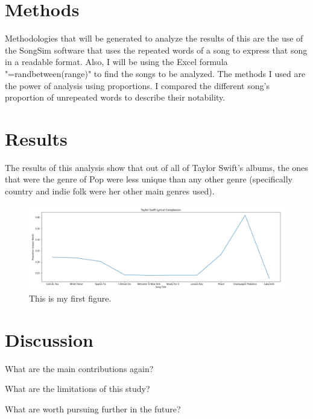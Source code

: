 \documentclass[12pt]{article}
\begin{document}
\section{Methods}
\label{sec:meth}

Methodologies that will be generated to analyze the results of this are the use of the SongSim software that uses the repeated words of a song to express that song in a readable format. Also, I will be using the Excel formula "=randbetween(range)" to find the songs to be analyzed. The methods I used are the power of analysis using proportions. I compared the different song's proportion of unrepeated words to describe their notability. 


\section{Results}
\label{sec:resu}
The results of this analysis show that out of all of Taylor Swift's albums, the ones that were the genre of Pop were less unique than any other genre (specifically country and indie folk were her other main genres used). 



\begin{figure}[htbp]
  \centering
  \includegraphics[width=\textwidth]{graph.png}
  \caption{This is my first figure.}
  \label{fig:graph}
\end{figure}

\section{Discussion}
\label{sec:disc}

What are the main contributions again?

What are the limitations of this study?

What are worth pursuing further in the future?




\end{document}
